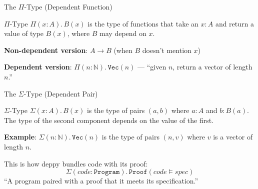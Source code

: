 \documentclass[aspectratio=169,11pt]{beamer}
\begin{document}
\begin{frame}{The $\Pi$-Type (Dependent Function)}
\begin{block}{$\Pi$-Type}
$\Pi(x : A).\, B(x)$ is the type of functions that take an $x : A$ and
return a value of type $B(x)$, where $B$ may depend on $x$.
\end{block}

\vspace{0.5em}
\textbf{Non-dependent version}: $A \to B$ (when $B$ doesn't mention $x$)

\textbf{Dependent version}: $\Pi(n : \mathbb{N}).\, \mathtt{Vec}(n)$
--- ``given $n$, return a vector of length $n$.''

\vspace{0.5em}
\begin{center}
\end{center}
\end{frame}

\begin{frame}{The $\Sigma$-Type (Dependent Pair)}
\begin{block}{$\Sigma$-Type}
$\Sigma(x : A).\, B(x)$ is the type of pairs $(a, b)$ where $a : A$
and $b : B(a)$.  The type of the second component depends on the
value of the first.
\end{block}

\vspace{0.5em}
\textbf{Example}: $\Sigma(n : \mathbb{N}).\, \mathtt{Vec}(n)$
is the type of pairs $(n, v)$ where $v$ is a vector of length $n$.

\vspace{0.5em}
This is how deppy bundles code with its proof:
\[
  \Sigma(\mathit{code} : \mathtt{Program}).\, \mathtt{Proof}(\mathit{code} \models \mathit{spec})
\]
``A program paired with a proof that it meets its specification.''
\end{frame}
\end{document}
